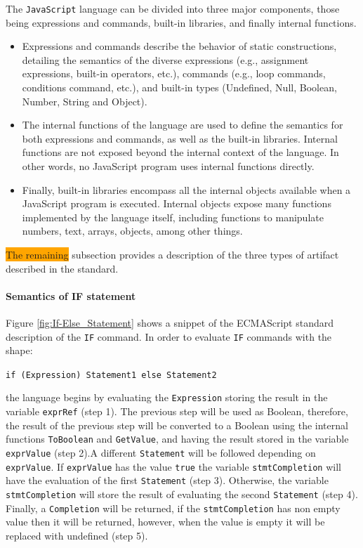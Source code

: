 \documentclass[runningheads]{llncs}
\begin{document}
The \texttt{JavaScript} language can be divided into three major components, those being expressions and commands, built-in libraries, and finally internal functions.
%
\begin{itemize}
\item Expressions and commands describe the behavior of static constructions, detailing the semantics of the diverse expressions (e.g., assignment expressions, built-in operators, etc.), commands (e.g., loop commands, conditions command, etc.), and built-in types (Undefined, Null, Boolean, Number, String and Object).
%
\item The internal functions of the language are used to define the semantics for both expressions and commands, as well as the built-in libraries. Internal functions are not exposed beyond the internal context of the language. In other words, no JavaScript program uses internal functions directly.
%
\item Finally, built-in libraries encompass all the internal objects available when a JavaScript program is executed. Internal objects expose many functions implemented by the language itself, including functions to manipulate numbers, text, arrays, objects, among other things.
\end{itemize}


\colorbox{orange}{The remaining} subsection provides a description of the three types of artifact described in the standard.

\paragraph{Semantics of IF statement}
Figure \ref{fig:If-Else_Statement} shows a snippet of the ECMAScript standard description of the \texttt{IF} command. In order to evaluate \texttt{IF} commands with the shape:

\begin{center}
\texttt{if (Expression) Statement1 else Statement2}
\end{center}

\noindent the language begins by evaluating the \texttt{Expression} storing the result in the variable \texttt{exprRef} (step 1). The previous step will be used as Boolean, therefore, the result of the previous step will be converted to a Boolean using the internal functions \texttt{ToBoolean} and \texttt{GetValue}, and having the result stored in the variable \texttt{exprValue} (step 2).A different \texttt{Statement} will be followed depending on \texttt{exprValue}. If \texttt{exprValue} has the value \texttt{true} the variable \texttt{stmtCompletion} will have the evaluation of the first \texttt{Statement} (step 3). Otherwise, the variable \texttt{stmtCompletion} will store the result of evaluating the second \texttt{Statement} (step 4). Finally, a \texttt{Completion} will be returned, if the \texttt{stmtCompletion} has non empty value then it will be returned, however, when the value is empty it will be replaced with undefined (step 5).
\end{document}
